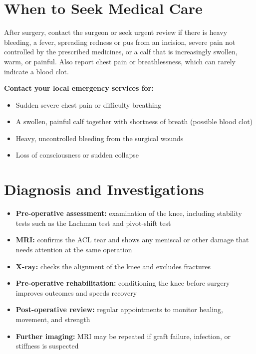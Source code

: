 \section*{When to Seek Medical Care}
After surgery, contact the surgeon or seek urgent review if there is heavy bleeding, a fever, spreading redness or pus from an incision, severe pain not controlled by the prescribed medicines, or a calf that is increasingly swollen, warm, or painful. Also report chest pain or breathlessness, which can rarely indicate a blood clot.

\textbf{Contact your local emergency services for:}
\begin{itemize}
    \item Sudden severe chest pain or difficulty breathing
    \item A swollen, painful calf together with shortness of breath (possible blood clot)
    \item Heavy, uncontrolled bleeding from the surgical wounds
    \item Loss of consciousness or sudden collapse
\end{itemize}

\section*{Diagnosis and Investigations}
\begin{itemize}
    \item \textbf{Pre-operative assessment:} examination of the knee, including stability tests such as the Lachman test and pivot-shift test
    \item \textbf{MRI:} confirms the ACL tear and shows any meniscal or other damage that needs attention at the same operation
    \item \textbf{X-ray:} checks the alignment of the knee and excludes fractures
    \item \textbf{Pre-operative rehabilitation:} conditioning the knee before surgery improves outcomes and speeds recovery
    \item \textbf{Post-operative review:} regular appointments to monitor healing, movement, and strength
    \item \textbf{Further imaging:} MRI may be repeated if graft failure, infection, or stiffness is suspected
\end{itemize}

